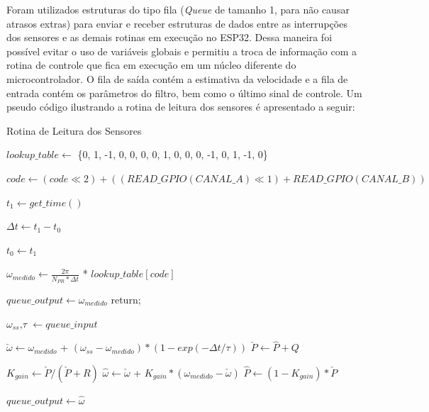 Foram utilizados estruturas do tipo fila (\emph{Queue} de tamanho 1, para não causar atrasos extras) para enviar e receber estruturas de dados entre as interrupções dos sensores e as demais rotinas em execução no ESP32. Dessa maneira foi possível evitar o uso de variáveis globais e permitiu a troca de informação com a rotina de controle que fica em execução em um núcleo diferente do microcontrolador. O fila de saída contém a estimativa da velocidade e a fila de entrada contém os parâmetros do filtro, bem como o último sinal de controle. Um pseudo código ilustrando a rotina de leitura dos sensores é apresentado a seguir:

\begin{algorithm}
\caption{Rotina de Leitura dos Sensores}
\label{alg:rotina_leitura_sensores}
\begin{algorithmic}[1]
  \State $lookup\_table \gets $ \{0, 1, -1, 0, 0, 0, 0, 1, 0, 0, 0, -1, 0, 1, -1, 0\}

  \State $code \gets \left(code \ll 2\right) + \left(\left(READ\_GPIO(CANAL\_A)\ll1\right)+READ\_GPIO(CANAL\_B)\right)$

  \State $t_1 \gets get\_time()$ 
  
  \State $\Delta{t} \gets  t_1 - t_0$
  
  \State $t_0 \gets t_1$ 
  
  \State $\omega_{medido} \gets \frac{2\pi}{N_{PR}*\Delta{t}}$ * $lookup\_table[code]$
  
   
    \State $queue\_output \gets \omega_{medido}$  
    \State return;
  \EndIf
  
  \State $\omega_{ss}$,$\tau$ $\gets  queue\_input$

  \State $\check{\omega} \gets \omega_{medido}$ + $( \omega_{ss} - \omega_{medido} ) * (1 - exp(-\Delta{t}/\tau))$
  \State $\check{P} \gets \hat{P} + Q$


  \State $K_{gain} \gets \check{P} / (\check{P} + R)$
  \State $\hat{\omega} \gets \check{\omega}$ + $K_{gain} * (\omega_{medido} - \check{\omega})$
  \State $\hat{P} \gets (1 - K_{gain}) * \check{P}$ 
  
  \State $queue\_output \gets \hat{\omega}$
\end{algorithmic}
\end{algorithm}


